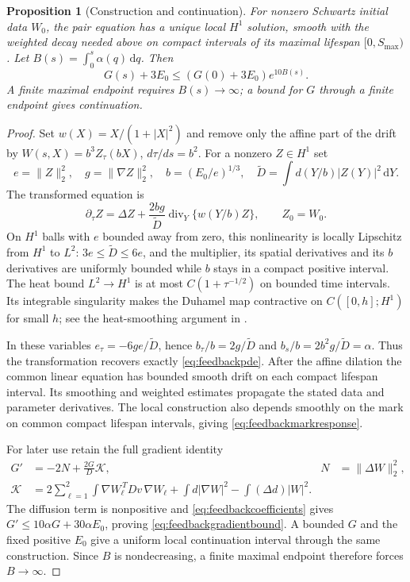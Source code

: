 \documentclass[11pt]{article}
\numberwithin{equation}{section}
\newtheorem{proposition}[theorem]{Proposition}
\newcommand{\dd}{\,\mathrm d}
\begin{document}
\begin{proposition}[Construction and continuation]\label{prop:feedbackexistence}
For nonzero Schwartz initial data $W_0$, the pair equation has a unique
local $H^1$ solution, smooth with the weighted decay needed above on
compact intervals of its maximal lifespan $[0,S_{\max})$.
Let $B(s)=\int_0^s\alpha(q)\dd q$. Then
\begin{equation}\label{eq:feedbackgradientbound}
 G(s)+3E_0\le(G(0)+3E_0)e^{10B(s)}.
\end{equation}
A finite maximal endpoint requires $B(s)\to\infty$; a bound for $G$
through a finite endpoint gives continuation.
\end{proposition}

\begin{proof}
Set $w(X)=X/(1+|X|^2)$ and remove only the affine part of the drift by
$W(s,X)=b^3Z_\tau(bX)$, $d\tau/ds=b^2$. For a nonzero $Z\in H^1$ set
\[
 e=\|Z\|_2^2,\quad g=\|\nabla Z\|_2^2,\quad
 b=(E_0/e)^{1/3},\quad
 \widetilde D=\int d(Y/b)|Z(Y)|^2\dd Y.
\]
The transformed equation is
\begin{equation}\label{eq:feedbacktransformed}
 \partial_\tau Z=\Delta Z+
 \frac{2bg}{\widetilde D}\operatorname{div}_Y
                    \{w(Y/b)Z\},\qquad Z_0=W_0.
\end{equation}
On $H^1$ balls with $e$ bounded away from zero, this nonlinearity is
locally Lipschitz from $H^1$ to $L^2$: $3e\le\widetilde D\le6e$,
and the multiplier, its spatial derivatives and its $b$ derivatives
are uniformly bounded while $b$ stays in a compact positive interval.
The heat bound $L^2\to H^1$ is at most $C(1+\tau^{-1/2})$ on bounded
time intervals. Its integrable singularity makes the Duhamel map
contractive on $C([0,h];H^1)$ for small $h$; see the heat-smoothing
argument in \cite[Lemmas 5.50--5.51]{HunterPDE}.

In these variables $e_\tau=-6ge/\widetilde D$, hence
$b_\tau/b=2g/\widetilde D$ and $b_s/b=2b^2g/\widetilde D=\alpha$.
Thus the transformation recovers exactly \eqref{eq:feedbackpde}.
After the affine dilation the common linear equation has bounded
smooth drift on each compact lifespan interval. Its smoothing and
weighted estimates propagate the stated data and parameter derivatives.
The local construction also depends smoothly on the mark on common
compact lifespan intervals, giving \eqref{eq:feedbackmarkresponse}.

For later use retain the full gradient identity
\begin{align}
 G'&=-2N+\frac{2G}{D}\mathcal K,
       &N&=\|\Delta W\|_2^2,\label{eq:feedbackgradientexact}\\
 \mathcal K&=2\sum_{\ell=1}^2\int
       \nabla W_\ell^{\,T}Dv\,\nabla W_\ell
       +\int d|\nabla W|^2-\int(\Delta d)|W|^2.\nonumber
\end{align}
The diffusion term is nonpositive and \eqref{eq:feedbackcoefficients}
gives $G'\le10\alpha G+30\alpha E_0$, proving
\eqref{eq:feedbackgradientbound}. A bounded $G$ and the fixed positive
$E_0$ give a uniform local continuation interval through the same
construction. Since $B$ is nondecreasing, a finite maximal endpoint
therefore forces $B\to\infty$.
\end{proof}
\end{document}
